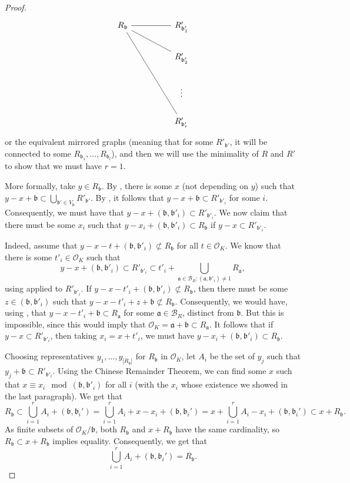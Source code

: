 \documentclass[a4paper,11pt,reqno]{amsart}
\theoremstyle{plain}
\theoremstyle{remark}
\newcommand{\cb}{\mathcal{B}}
\newcommand{\co}{\mathcal{O}}
\newcommand{\ga}{\mathfrak{a}}
\newcommand{\gb}{\mathfrak{b}}
\begin{document}
\begin{proof}
				\[\begin{tikzcd}
					{R_\gb} && {R'_{\gb'_1}} \\
					&& {R'_{\gb'_2}} \\
					&& \vdots \\
					&& {R'_{\gb'_r}}
					\arrow[no head, from=1-1, to=1-3]
					\arrow[no head, from=2-3, to=1-1]
					\arrow[no head, from=4-3, to=1-1]
				\end{tikzcd}\] or the equivalent mirrored graphs (meaning that for some $R'_{\gb'}$, it will be connected to some $R_{\gb_1}, \dots,R_{\gb_l}$), and then we will use the minimality of $R$ and $R'$ to show that we must have $r = 1$.
				
				More formally, take $y \in R_\gb$. By , there is some $x$ (not depending on $y$) such that $y-x+\gb \subset \bigcup_{\gb' \in V_\gb} R'_{\gb'}$. By , it follows that $y-x + \gb \subset R'_{\gb'_i}$ for some $i$. Consequently, we must have that $y-x+(\gb,\gb'_i) \subset R'_{\gb'_i}$. We now claim that there must be some $x_i$ such that $y-x_i+(\gb,\gb'_i) \subset R_\gb$ if $y-x \subset R'_{\gb'_i}$.
				
				Indeed, assume that $y-x-t+(\gb,\gb'_i) \not \subset R_\gb$ for all $t\in \co_K$. We know that there is some $t'_i\in \co_K$ such that $$y-x+(\gb,\gb'_i) \subset R'_{\gb'_i} \subset t'_i+\bigcup_{\ga \in \cb_R: (\ga,\gb'_i) \neq 1 }R_\ga,$$ using  applied to $R'_{\gb'_i}$. If $y-x-t'_i+(\gb,\gb'_i) \not \subset R_\gb$, then there must be some $z \in (\gb,\gb'_i)$ such that $y-x-t'_i+z+\gb \not \subset R_\gb$. Consequently, we would have, using , that  $y-x-t'_i+\gb \subset R_\ga$ for some $\ga \in \cb_R$, distinct from $\gb$. But this is impossible, since this would imply that $\co_K = \ga+\gb \subset R_\ga$. It follows that if $y-x \subset R'_{\gb'_i}$, then taking $x_i = x+t'_i$, we must have $y-x_i + (\gb,\gb'_i) \subset R_\gb$.
				
				Choosing representatives $y_1,\dots,y_{|R_\gb|}$ for $R_\gb$ in $\co_K$, let $A_i$ be the set of $y_j$ such that $y_j + \gb \subset R'_{\gb'_i}$. Using the Chinese Remainder Theorem, we can find some $x$ such that $x \equiv x_i \mod (\gb,\gb'_i)$ for all $i$ (with the $x_i$ whose existence we showed in the last paragraph). We get that $$R_\gb \subset \bigcup_{i=1}^r A_i + (\gb,\gb_i') = \bigcup_{i=1}^r A_i +x-x_i + (\gb,\gb_i') = x+\bigcup_{i=1}^r A_i -x_i+ (\gb,\gb_i')  \subset x+ R_\gb.$$ As finite subsets of $\co_K/\gb$, both $R_\gb$ and $x+R_\gb$ have the same cardinality, so $R_\gb \subset x+R_\gb$ implies equality. Consequently, we get that
				$$\bigcup_{i=1}^r A_i + (\gb,\gb_i') = R_\gb.$$ 
				

\end{proof}
\end{document}

